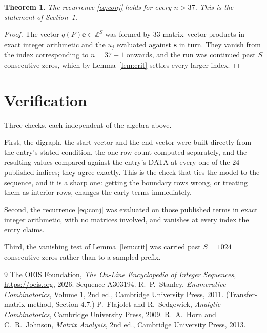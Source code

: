 \documentclass[11pt,a4paper]{article}
\theoremstyle{plain}
\newtheorem{theorem}{Theorem}
\theoremstyle{definition}
\begin{document}
\begin{theorem}
The recurrence \eqref{eq:conj} holds for every $n>37$. This is the statement of
Section~1.
\end{theorem}

\begin{proof}
The vector $q(P)\mathbf{e}\in\mathbb{Z}^{S}$ was formed by $33$ matrix--vector
products in exact integer arithmetic and the $u_j$ evaluated against $\mathbf{s}$ in turn.
They vanish from the index corresponding to $n=37+1$ onwards, and the run was continued
past $S$ consecutive zeros, which by Lemma~\ref{lem:crit} settles every larger index.
\end{proof}

\section{Verification}

Three checks, each independent of the algebra above.

First, the digraph, the start vector and the end vector were built directly from the
entry's stated condition, the one-row count computed separately, and the resulting values
compared against the entry's DATA at every one of the $24$ published indices; they
agree exactly. This is the check that ties the model to the sequence, and it is a sharp one:
getting the boundary rows wrong, or treating them as interior rows, changes the early terms
immediately.

Second, the recurrence \eqref{eq:conj} was evaluated on those published terms in exact
integer arithmetic, with no matrices involved, and vanishes at every index the entry claims.

Third, the vanishing test of Lemma~\ref{lem:crit} was carried past $S=1024$ consecutive
zeros rather than to a sampled prefix.

\begin{thebibliography}{9}
 The OEIS Foundation, \emph{The On-Line Encyclopedia of Integer
Sequences}, \url{https://oeis.org}, 2026. Sequence A303194.
 R.~P.~Stanley, \emph{Enumerative Combinatorics}, Volume 1, 2nd ed.,
Cambridge University Press, 2011. (Transfer-matrix method, Section 4.7.)
 P.~Flajolet and R.~Sedgewick, \emph{Analytic Combinatorics}, Cambridge
University Press, 2009.
 R.~A.~Horn and C.~R.~Johnson, \emph{Matrix Analysis}, 2nd ed., Cambridge
University Press, 2013.
\end{thebibliography}
\end{document}
